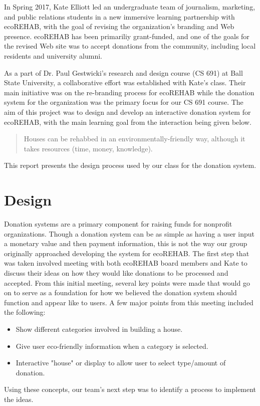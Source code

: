 \documentclass[letter]{article}
\begin{document}
In Spring 2017, Kate Elliott led an undergraduate team of journalism,
marketing, and public relations students in a new immersive learning
partnership with ecoREHAB, with the goal of revising the organization's
branding and Web presence.
ecoREHAB has been primariliy grant-funded, and one of the 
goals for the revised Web site was to accept donations from
the community, including local residents and university alumni.

As a part of Dr. Paul Gestwicki's research and design course (CS 691) at Ball State University, a collaborative effort was established with Kate's class. Their main initiative was on the re-branding process for ecoREHAB while the donation system for the organization was the primary focus for our CS 691 course. The aim of this project was to design and develop an interactive donation system for ecoREHAB, with the main learning goal from the interaction being given below.

\begin{quote}
	Houses can be rehabbed in an environmentally-friendly way, although it takes resources (time, money, knowledge).
\end{quote}

This report presents the design process used by our class for the donation system.

\section*{Design}
Donation systems are a primary component for raising funds for nonprofit organizations. Though a donation system can be as simple as having a user input a monetary value and then payment information, this is not the way our group originally approached developing the system for ecoREHAB. The first step that was taken involved meeting with both ecoREHAB board members and Kate to discuss their ideas on how they would like donations to be processed and accepted. From this initial meeting, several key points were made that would go on to serve as a foundation for how we believed the donation system should function and appear like to users. A few major points from this meeting included the following:
\begin{itemize}
	\item{Show different categories involved in building a house.}
	\item{Give user eco-friendly information when a category is selected.}
	\item{Interactive "house" or display to allow user to select type/amount of donation.}
\end{itemize}
Using these concepts, our team's next step was to identify a process to implement the ideas.
\end{document}
